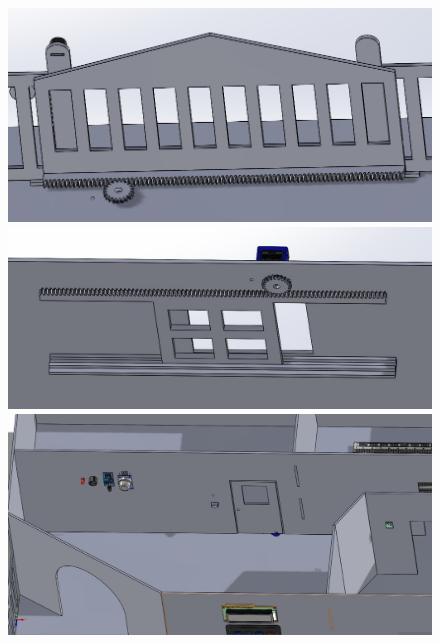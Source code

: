 \begin{figure}[htbp]
    \centering
    \begin{minipage}[t]{0.2\textwidth}
        \centering
        \includegraphics[width=\textwidth]{figs/Smart_Home5.jpg}
    \end{minipage}
    \hfill
    \begin{minipage}[t]{0.2\textwidth}
        \centering
        \includegraphics[width=\textwidth]{figs/Smart_Home6.jpg}
    \end{minipage}
    \hfill
    \begin{minipage}[t]{0.2\textwidth}
        \centering
        \includegraphics[width=\textwidth]{figs/Smart_Home7.jpg}
    \end{minipage}

\end{figure}
